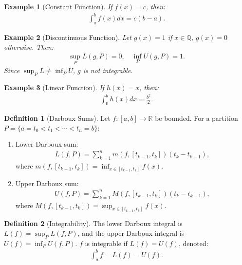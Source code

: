 \documentclass[7pt]{article}
\theoremstyle{definition}
\newtheorem{definition}{Definition}
\theoremstyle{plain}
\newtheorem{example}{Example}
\begin{document}
\begin{example}[Constant Function]
If $ f(x) = c $, then:
\begin{align}
\int_a^b f(x) dx = c(b-a).
\end{align}
\end{example}

\begin{example}[Discontinuous Function]
Let $ g(x) = 1 $ if $ x \in \mathbb{Q} $, $ g(x) = 0 $ otherwise. Then:
\begin{align}
\sup_P L(g, P) = 0, \quad \inf_P U(g, P) = 1.
\end{align}
Since $ \sup_P L \neq \inf_P U $, $ g $ is not integrable.
\end{example}

\begin{example}[Linear Function]
If $ h(x) = x $, then:
\begin{align}
\int_0^b h(x) dx = \frac{b^2}{2}.
\end{align}
\end{example}

\begin{definition}[Darboux Sums]
Let $ f : [a, b] \to \mathbb{R} $ be bounded. For a partition $ P = \{a = t_0 < t_1 < \cdots < t_n = b\} $:
\begin{enumerate}
    \item Lower Darboux sum:
    \begin{align}
    L(f, P) = \sum_{k=1}^n m(f, [t_{k-1}, t_k])(t_k - t_{k-1}),
    \end{align}
    where $ m(f, [t_{k-1}, t_k]) = \inf_{x \in [t_{k-1}, t_k]} f(x) $.
    \item Upper Darboux sum:
    \begin{align}
    U(f, P) = \sum_{k=1}^n M(f, [t_{k-1}, t_k])(t_k - t_{k-1}),
    \end{align}
    where $ M(f, [t_{k-1}, t_k]) = \sup_{x \in [t_{k-1}, t_k]} f(x) $.
\end{enumerate}
\end{definition}

\begin{definition}[Integrability]
The lower Darboux integral is $ L(f) = \sup_P L(f, P) $, and the upper Darboux integral is $ U(f) = \inf_P U(f, P) $. $ f $ is integrable if $ L(f) = U(f) $, denoted:
\begin{align}
\int_a^b f = L(f) = U(f).
\end{align}
\end{definition}
\end{document}
